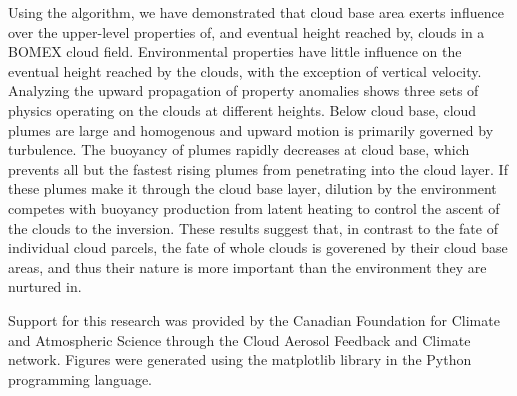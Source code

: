\documentclass[acp]{copernicus}
\begin{document}
Using the algorithm, we have demonstrated that cloud base area exerts influence 
over the upper-level properties of, and eventual height reached by, clouds in a 
BOMEX cloud field.  Environmental properties have little influence on the 
eventual height reached by the clouds, with the exception of vertical velocity.
Analyzing the upward propagation of property anomalies shows three sets of 
physics operating on the clouds at different heights.  Below cloud base, cloud 
plumes are large and homogenous and upward motion is primarily governed by 
turbulence.  The buoyancy of plumes rapidly decreases at cloud base, which 
prevents all but the fastest rising plumes from penetrating into the cloud 
layer.  If these plumes make it through the cloud base layer, dilution by the 
environment competes with buoyancy production from latent heating to control 
the ascent of the clouds to the inversion.  These results suggest that, in 
contrast to the fate of individual cloud parcels, the fate of whole clouds is 
goverened by their cloud base areas, and thus their nature is more important 
than the environment they are nurtured in.



\begin{acknowledgements}
Support for this research was provided by the Canadian Foundation for Climate 
and Atmospheric Science through the Cloud Aerosol Feedback and Climate 
network.  Figures were generated using the matplotlib library in the Python
programming language.
\end{acknowledgements}






\end{document}
